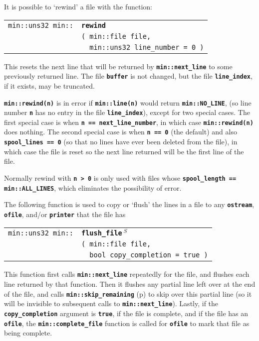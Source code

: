 \documentclass[12pt]{article}
\makeatletter
\newcommand{\TT}[1]{{\tt \bfseries #1}}
\newcommand{\ttindex}[1]{\index{#1@{\tt #1}}}
\newcommand{\pagref}[1]{p\pageref{#1}}
\newcommand{\EOL}{\penalty \exhyphenpenalty}
\newenvironment{indpar}[1][0.3in]%
	{\begin{list}{}%
		     {\setlength{\itemsep}{0in}%
		      \setlength{\topsep}{0in}%
		      \setlength{\parsep}{1ex}%
		      \setlength{\labelwidth}{#1}%
		      \setlength{\leftmargin}{#1}%
		      \addtolength{\leftmargin}{\labelsep}}%
	 \item}%
	{\end{list}}
\newcommand{\LABEL}[1]{\label{#1}}
\newlength{\ARGBREAKLENGTH}
\newcommand{\ARGBREAK}[1][\ARGBREAKLENGTH]{\\&\hspace*{#1}}
\newcommand{\MINKEY}[1]%
	   {\TT{#1}\ttindex{min::#1}\ttindex{#1}}
\newcommand{\RESIZE}{$\,^S$}
\makeatother
\begin{document}
It is possible to `rewind' a file with the function:

\begin{indpar}[1em]\begin{tabular}{r@{}l}
\verb|min::uns32 min::|
    & \MINKEY{rewind}\ARGBREAK
	\verb|( min::file file,|\ARGBREAK
	\verb|  min::uns32 line_number = 0 )|
\LABEL{MIN::REWIND_FILE} \\
\end{tabular}\end{indpar}

This resets the next line that will be returned by
\TT{min::\EOL next\_\EOL line} to some previously
returned line.  The file \TT{buffer} is not changed, but
the file \TT{line\_\EOL index}, if it exists, may be truncated.

\TT{min::rewind(n)} is in error if
\TT{min::line(n)} would return \TT{min::\EOL NO\_\EOL LINE},
(so line number \TT{n} has no entry in the file \TT{line\_\EOL index}),
except for two special cases.
The first special case is when \TT{n == next\_\EOL line\_\EOL number},
in which case \TT{min::\EOL rewind(n)} does nothing.
The second special case is when \TT{n == 0} (the default)
and also \TT{spool\_\EOL lines == 0} (so that no lines have ever been
deleted from the file), in which case the file is reset so the next
line returned will be the first line of the file.

Normally rewind with \TT{n > 0} is only
used with files whose \TT{spool\_\EOL length == min::\EOL ALL\_\EOL LINES},
which eliminates the possibility of error.

The following function is used to copy or `flush' the lines in a file
to any \TT{ostream}, \TT{ofile}, and/or \TT{printer}
that the file has

\begin{indpar}[1em]\begin{tabular}{r@{}l}
\verb|min::uns32 min::|
    & \MINKEY{flush\_\EOL file\RESIZE}\ARGBREAK
          \verb|( min::file file,|\ARGBREAK
	  \verb|  bool copy_completion = true )|
\LABEL{MIN::FLUSH_FILE} \\
\end{tabular}\end{indpar}

This function first calls \TT{min::next\_line} repeatedly
for the file, and flushes each line returned by that function.
Then it flushes any partial line left over at the end of the
file, and calls \TT{min::\EOL skip\_\EOL remaining}
(\pagref{MIN::SKIP_REMAINING}) to skip over this partial line
(so it will be invisible to subsequent calls to
\TT{min::\EOL next\_\EOL line}).
Lastly, if the \TT{copy\_\EOL completion} argument is \TT{true},
if the file is complete, and
if the file has an \TT{ofile}, the \TT{min::\EOL complete\_\EOL file}
function is called for \TT{ofile} to mark that file as being complete.
\end{document}
